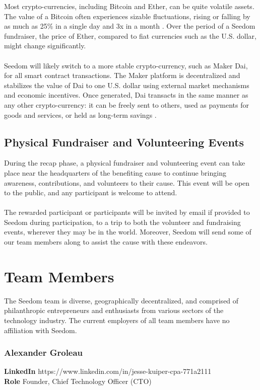 \documentclass[11pt]{article}
\begin{document}
Most crypto-currencies, including Bitcoin and Ether, can be quite volatile assets. The value of a Bitcoin often experiences sizable fluctuations, rising or falling by as much as 25\% in a single day and 3x in a month \cite{10}. Over the period of a Seedom fundraiser, the price of Ether, compared to fiat currencies such as the U.S. dollar, might change significantly.\\\\
Seedom will likely switch to a more stable crypto-currency, such as Maker Dai, for all smart contract transactions. The Maker platform is decentralized and stabilizes the value of Dai to one U.S. dollar using external market mechanisms and economic incentives. Once generated, Dai transacts in the same manner as any other crypto-currency: it can be freely sent to others, used as payments for goods and services, or held as long-term savings \cite{9}. 

\subsection{Physical Fundraiser and Volunteering Events}

During the recap phase, a physical fundraiser and volunteering event can take place near the headquarters of the benefiting cause to continue bringing awareness, contributions, and volunteers to their cause. This event will be open to the public, and any participant is welcome to attend.\\\\
The rewarded participant or participants will be invited by email if provided to Seedom during participation, to a trip to both the volunteer and fundraising events, wherever they may be in the world. Moreover, Seedom will send some of our team members along to assist the cause with these endeavors.

\section{Team Members}

The Seedom team is diverse, geographically decentralized, and comprised of philanthropic entrepreneurs and enthusiasts from various sectors of the technology industry. The current employers of all team members have no affiliation with Seedom.

\subsubsection{Alexander Groleau}
\begin{minipage}{\textwidth}
\textbf{LinkedIn} https://www.linkedin.com/in/jesse-kuiper-cpa-771a2111\\
\textbf{Role} Founder, Chief Technology Officer (CTO)\\
\end{minipage}
\end{document}
